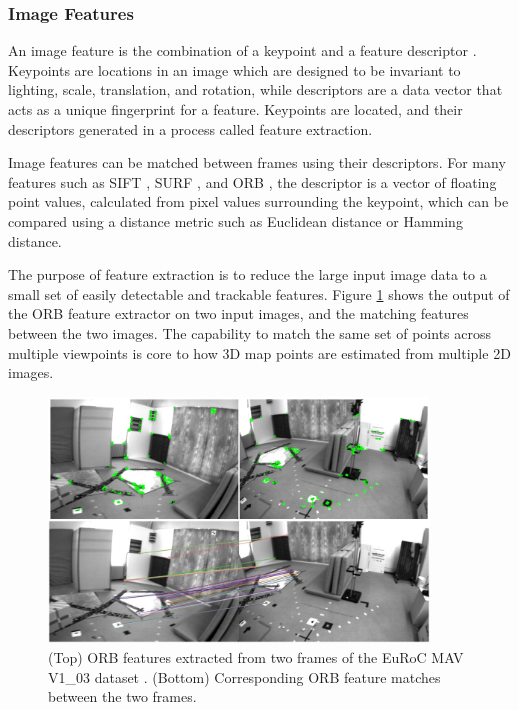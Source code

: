 \subsubsection{Image Features}

An image feature is the combination of a keypoint and a feature descriptor \cite{loweObjectRecognitionLocal1999}. Keypoints are locations in an image which are designed to be invariant to lighting, scale, translation, and rotation, while descriptors are a data vector that acts as a unique fingerprint for a feature. Keypoints are located, and their descriptors generated in a process called feature extraction.

Image features can be matched between frames using their descriptors. For many features such as SIFT \cite{loweObjectRecognitionLocal1999}, SURF \cite{baySURFSpeededRobust2006}, and ORB \cite{rubleeORBEfficientAlternative2011}, the descriptor is a vector of floating point values, calculated from pixel values surrounding the keypoint, which can be compared using a distance metric such as Euclidean distance or Hamming distance.

The purpose of feature extraction is to reduce the large input image data to a small set of easily detectable and trackable features. Figure \ref{fig:feature_extraction_and_matching} shows the output of the ORB feature extractor on two input images, and the matching features between the two images. The capability to match the same set of points across multiple viewpoints is core to how 3D map points are estimated from multiple 2D images.

\begin{figure}[!ht]
    \centering
    \includegraphics[width=0.9\textwidth]{resources/feature_extraction_and_matching.png}
    \caption[Image Feature Extraction and Matching]{(Top) ORB features extracted from two frames of the EuRoC MAV V1\_03 dataset \cite{burriEuRoCMicroAerial2016}. (Bottom) Corresponding ORB feature matches between the two frames.}
    \label{fig:feature_extraction_and_matching}
\end{figure}

